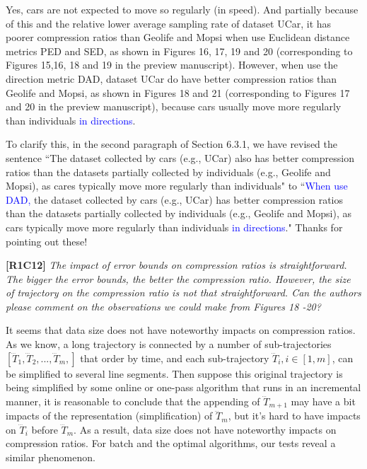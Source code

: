 \documentclass{letter}
\begin{document}
{Yes, cars are not expected to move so regularly (in speed). And partially because of this and the relative lower average sampling rate of dataset UCar, it has poorer compression ratios than Geolife and Mopsi when use Euclidean distance metrics PED and SED, as shown in Figures 16, 17, 19 and 20 (corresponding to Figures 15,16, 18 and 19 in the preview manuscript). However, when use the direction metric DAD, dataset UCar do have better compression ratios than Geolife and Mopsi, as shown in Figures 18 and 21 (corresponding to Figures 17 and 20 in the preview manuscript), because cars usually move more regularly than individuals \textcolor{blue}{in directions}.

To clarify this, in the second paragraph of Section 6.3.1, we have revised the sentence ``The dataset collected by cars (e.g., UCar) also has better compression ratios than the datasets partially collected by individuals (e.g., Geolife and Mopsi), as cares typically move more regularly than individuals" to ``\textcolor{blue}{When use DAD,} the dataset collected by cars (e.g., UCar) has better compression ratios than the datasets partially collected by individuals (e.g., Geolife and Mopsi), as cars typically move more regularly than individuals \textcolor{blue}{in directions}."
Thanks for pointing out these!


\textbf{[R1C12]} \emph{ The impact of error bounds on compression ratios is straightforward. The bigger the error bounds, the better the compression ratio. However, the size of trajectory on the compression ratio is not that straightforward. Can the authors please comment on the observations we could make from Figures 18 -20? }

It seems that data size does not have noteworthy impacts on compression ratios. As we know, a long trajectory is connected by a number of sub-trajectories $[\dddot{T}_1,\dddot{T}_2,..., \dddot{T}_m, ]$ that order by time, and each sub-trajectory $\dddot{T}_i, i \in [1,m]$, can be simplified to several line segments. Then suppose this original trajectory is being simplified by some online or one-pass algorithm that runs in an incremental manner, it is reasonable to conclude that the appending of $\dddot{T}_{m+1}$ may have a bit impacts of the representation (simplification) of $\dddot{T}_{m}$, but it's hard to have impacts on $\dddot{T}_i$ before $\dddot{T}_{m}$. As a result, data size does not have noteworthy impacts on compression ratios. For batch and the optimal algorithms, our tests reveal a similar phenomenon.

}
\end{document}
